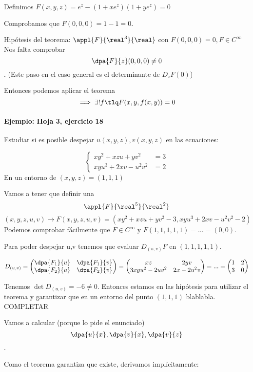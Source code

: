 \documentclass{apuntes}
\begin{document}
Definimos $F(x,y,z) = e^z - (1+xe^z)(1+ye^z) = 0$

Comprobamos que $F(0,0,0) = 1-1 = 0$.

Hipótesis del teorema: $\appl{F}{\real^3}{\real}$ con $F(0,0,0) = 0, F \in C^{\infty}$
Nos falta comprobar \[\dpa{F}{z}(0,0,0) \neq 0\]. (Este paso en el caso general es el determinante de $D_zF(0)$)

Entonces podemos aplicar el teorema 
\[\implies \exists ! f \tlq F(x,y,f(x,y)) = 0\]

\paragraph{Ejemplo: Hoja 3, ejercicio 18}

Estudiar si es posible despejar $u(x,y,z), v(x,y,z)$ en las ecuaciones:

\[\left\{\begin{matrix} xy^2+xzu+yv^2 &= 3\\ xyu^3+2xv-u^2v^2 &= 2\end{matrix}\right.\]
En un entorno de $(x,y,z) = (1,1,1)$

Vamos a tener que definir una 
\[\appl{F}{\real^5}{\real^2}\]
\[(x,y,z,u,v) \rightarrow F(x,y,z,u,v)= (xy^2+xzu+yv^2-3,xyu^3+2xv-u^2v^2-2)\]
Podemos comprobar fácilmente que $F\in C^{\infty}$ y $F(1,1,1,1,1) = ... = (0,0)$.

Para poder despejar u,v tenemos que evaluar $D_{(u,v)}F$ en $(1,1,1,1,1)$.

\[D_{(u,v)} = \begin{pmatrix} \dpa{F_1}{u}&\dpa{F_1}{v}\\ \dpa{F_2}{u} &\dpa{F_2}{v}\end{pmatrix} 
= \begin{pmatrix} xz & 2yv\\3xyu^2-2uv^2 & 2x-2u^2v \end{pmatrix} = ... = \begin{pmatrix} 1&2\\ 3&0 \end{pmatrix}\]

Tenemos $\det D_{(u,v)} = -6 \neq 0$. Entonces estamos en las hipótesis para utilizar el teorema y garantizar que en un entorno del punto $(1,1,1)$ blablabla.
COMPLETAR

Vamos a calcular (porque lo pide el enunciado) \[\dpa{u}{x},\dpa{v}{x},\dpa{v}{z}\].

Como el teorema garantiza que existe, derivamos implícitamente:
\end{document}
